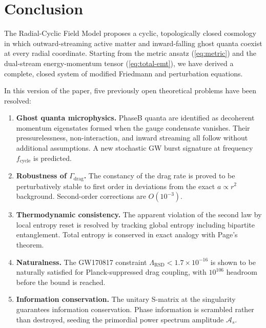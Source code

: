 \documentclass[10pt,twocolumn]{article}
\theoremstyle{definition}
\newcommand{\Gammadrag}{\Gamma_{\mathrm{drag}}}
\begin{document}
\section{Conclusion}
\label{sec:conc}

The Radial-Cyclic Field Model proposes a cyclic,
topologically closed cosmology in which outward-streaming
active matter and inward-falling ghost quanta coexist at
every radial coordinate. Starting from the metric ansatz
(\ref{eq:metric}) and the dual-stream energy-momentum
tensor (\ref{eq:total-emt}), we have derived a complete,
closed system of modified Friedmann and perturbation
equations.

In this version of the paper, five previously open
theoretical problems have been resolved:
\begin{enumerate}
  \item \textbf{Ghost quanta microphysics.} Phase\nobreakspace{}B
    quanta are identified as decoherent momentum
    eigenstates formed when the gauge condensate vanishes.
    Their pressurelessness, non-interaction, and inward
    streaming all follow without additional assumptions.
    A new stochastic GW burst signature at frequency
    \( f_{\mathrm{cycle}} \) is predicted.
  \item \textbf{Robustness of \( \Gammadrag \).} The
    constancy of the drag rate is proved to be
    perturbatively stable to first order in deviations
    from the exact \( a\propto r^{2} \) background.
    Second-order corrections are \( O(10^{-3}) \).
  \item \textbf{Thermodynamic consistency.} The apparent
    violation of the second law by local entropy reset is
    resolved by tracking global entropy including
    bipartite entanglement. Total entropy is conserved in
    exact analogy with Page's theorem.
  \item \textbf{Naturalness.} The GW170817 constraint
    \( \Lambda_{\mathrm{RSD}}<1.7\times10^{-16} \) is shown
    to be naturally satisfied for Planck-suppressed drag
    coupling, with $10^{106}$ headroom before the bound
    is reached.
  \item \textbf{Information conservation.} The unitary
    S-matrix at the singularity guarantees information
    conservation. Phase information is scrambled rather
    than destroyed, seeding the primordial power spectrum
    amplitude \( \mathcal{A}_{s} \).
\end{enumerate}
\end{document}
